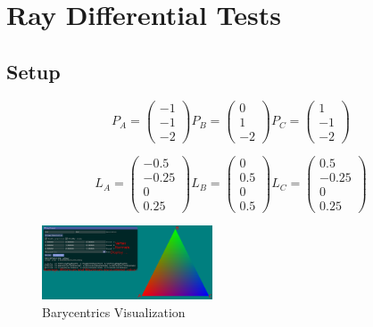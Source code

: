 \documentclass[12pt]{article}
\newcommand{\oneimgwidth}{0.45}
\begin{document}
\section{Ray Differential Tests}

\subsection{Setup}

\begin{equation}
P_A = 
\begin{pmatrix}
-1 \\
-1 \\
-2
\end{pmatrix}
P_B = 
\begin{pmatrix}
0 \\
1 \\
-2
\end{pmatrix}
P_C = 
\begin{pmatrix}
1 \\
-1 \\
-2
\end{pmatrix}
\end{equation}

\begin{equation}
L_A = 
\begin{pmatrix}
-0.5 \\
-0.25 \\
0 \\
0.25
\end{pmatrix}
L_B = 
\begin{pmatrix}
0 \\
0.5 \\
0 \\
0.5
\end{pmatrix}
L_C = 
\begin{pmatrix}
0.5 \\
-0.25 \\
0 \\
0.25
\end{pmatrix}
\end{equation}

\begin{figure}[htbp] 
	\centering
	\includegraphics[width=\oneimgwidth\textwidth]{description.png}
	\caption{Barycentrics Visualization}
	\label{fig:desc}
\end{figure}
\end{document}
